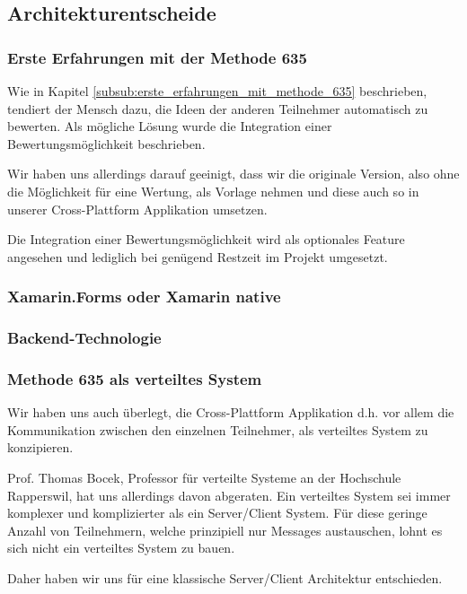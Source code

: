 \subsection{Architekturentscheide}

\subsubsection{Erste Erfahrungen mit der Methode 635}
Wie in Kapitel \ref{subsub:erste_erfahrungen_mit_methode_635} beschrieben, tendiert der Mensch dazu, die Ideen der anderen Teilnehmer automatisch zu bewerten. Als mögliche Lösung wurde die Integration einer Bewertungsmöglichkeit beschrieben.


Wir haben uns allerdings darauf geeinigt, dass wir die originale Version, also ohne die Möglichkeit für eine Wertung, als Vorlage nehmen und diese auch so in unserer Cross-Plattform Applikation umsetzen. 


Die Integration einer Bewertungsmöglichkeit wird als optionales Feature angesehen und lediglich bei genügend Restzeit im Projekt umgesetzt.

\subsubsection{Xamarin.Forms oder Xamarin native}

\subsubsection{Backend-Technologie}

\subsubsection{Methode 635 als verteiltes System}
Wir haben uns auch überlegt, die Cross-Plattform Applikation d.h. vor allem die Kommunikation zwischen den einzelnen Teilnehmer, als verteiltes System zu konzipieren.


Prof. Thomas Bocek, Professor für verteilte Systeme an der Hochschule Rapperswil, hat uns allerdings davon abgeraten. Ein verteiltes System sei immer komplexer und komplizierter als ein Server/Client System. Für diese geringe Anzahl von Teilnehmern, welche prinzipiell nur Messages austauschen, lohnt es sich nicht ein verteiltes System zu bauen. 


Daher haben wir uns für eine klassische Server/Client Architektur entschieden.

